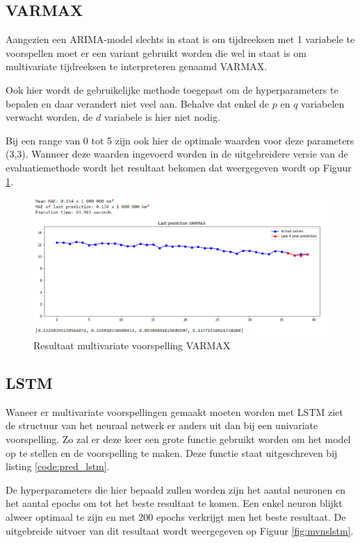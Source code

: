 \subsection{VARMAX}
Aangezien een ARIMA-model slechts in staat is om tijdreeksen met 1 variabele te voorspellen moet er een variant gebruikt worden die wel in staat is om multivariate tijdreeksen te interpreteren genaamd VARMAX. 

Ook hier wordt de gebruikelijke methode toegepast om de hyperparameters te bepalen en daar verandert niet veel aan. Behalve dat enkel de $p$ en $q$ variabelen verwacht worden, de $d$ variabele is hier niet nodig. 

Bij een range van 0 tot 5 zijn ook hier de optimale waarden voor deze parameters (3,3). Wanneer deze waarden ingevoerd worden in de uitgebreidere versie van de evaluatiemethode wordt het resultaat bekomen dat weergegeven wordt op Figuur \ref{fig:mvnsvarmax}.

\begin{figure}[!h]
    \centering
    \caption{Resultaat multivariate voorspelling VARMAX}
    \label{fig:mvnsvarmax}
    \includegraphics[width=1\linewidth]{mv_ns_varmax}
\end{figure}

\clearpage
\subsection{LSTM}

Waneer er multivariate voorspellingen gemaakt moeten worden met LSTM ziet de structuur van het neuraal netwerk er anders uit dan bij een univariate voorspelling. Zo zal er deze keer een grote functie gebruikt worden om het model op te stellen en de voorspelling te maken. Deze functie staat uitgeschreven bij listing \ref{code:pred_lstm}.

De hyperparameters die hier bepaald zullen worden zijn het aantal neuronen en het aantal epochs om tot het beste resultaat te komen. Een enkel neuron blijkt alweer optimaal te zijn en met 200 epochs verkrijgt men het beste resultaat. De uitgebreide uitvoer van dit resultaat wordt weergegeven op Figuur \ref{fig:mvnslstm}.

